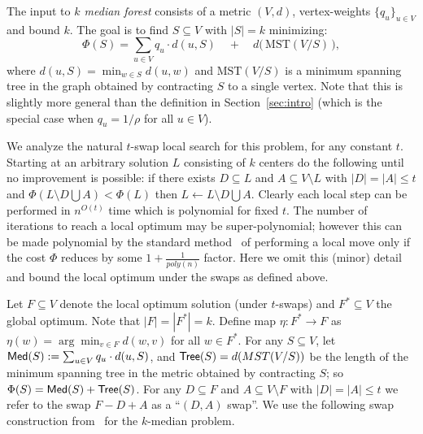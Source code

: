 \documentclass[11pt,twoside,a4paper]{article}
\newcommand{\sse}{\subseteq}
\newcommand{\MST}{\ensuremath{\textrm{MST}}}
\begin{document}
The input to {\em $k$ median forest} consists of a metric $(V,d)$, vertex-weights $\{q_u\}_{u\in V}$ and bound $k$. The
goal is to find $S\sse V$ with $|S|=k$ minimizing:
$$\Phi(S)=  \sum_{u\in V} q_u\cdot d(u,S) \quad + \quad d\big(\,\MST(V/S)\,\big),$$
where $d(u,S)=\min_{w\in S} d(u,w)$ and $\MST(V/S)$ is a minimum spanning tree in the graph obtained by contracting $S$
to a single vertex. Note that this is slightly more general than the definition in Section~\ref{sec:intro} (which is
the special case when $q_u=1/\rho$ for all $u\in V$).

We analyze the natural $t$-swap local search for this problem, for any constant $t$. Starting at an arbitrary solution
$L$ consisting of $k$ centers do the following until no improvement is possible: if there exists $D\sse L$ and $A\sse
V\setminus L$ with $|D|=|A|\le t$ and $\Phi(L\setminus D \bigcup A) < \Phi(L)$ then $L\gets L\setminus D \bigcup A$.
Clearly each local step can be performed in $n^{O(t)}$ time which is polynomial for fixed $t$. The number of iterations
to reach a local optimum may be super-polynomial; however this can be made polynomial by the standard
method~\cite{AGKMMP04} of performing a  local move only if the cost $\Phi$ reduces by some $1+\frac1{poly(n)}$ factor.
Here we omit this (minor) detail and bound the local optimum under the swaps as defined above.

Let $F\sse V$ denote the local optimum solution (under $t$-swaps) and $F^*\sse V$ the global optimum. Note that
$|F|=|F^*|=k$. Define map $\eta: F^*\rightarrow F$ as $\eta(w)=\arg\min_{v\in F} d(w,v)$ for all $w\in F^*$. For any
$S\sse V$, let ${\sf Med}(S) := \sum_{u\in V} q_u\cdot d(u,S)$, and ${\sf Tree}(S) = d(MST(V/S))$ be the length of the minimum
spanning tree in the metric obtained by contracting $S$; so $\Phi(S) = {\sf Med}(S)+{\sf Tree}(S)$. For any $D\sse F$ and $A\sse
V\setminus F$ with $|D|=|A|\le t$ we refer to the swap $F-D+A$ as a ``$(D,A)$ swap''. We use the following swap
construction from~\cite{GT08} for the $k$-median problem.
\end{document}
